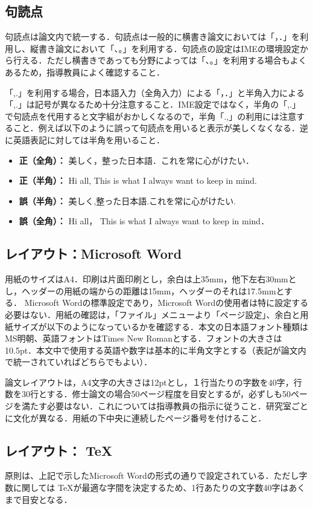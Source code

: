 \documentclass[uplatex,dvipdfmx,a4paper]{jsarticle}
\begin{document}
\subsection{句読点}
句読点は論文内で統一する．句読点は一般的に横書き論文においては「，．」を利用し、縦書き論文において「、。」を利用する．句読点の設定はIMEの環境設定から行える．ただし横書きであっても分野によっては「、。」を利用する場合もよくあるため，指導教員によく確認すること．

「,.」を利用する場合，日本語入力（全角入力）による「，．」と半角入力による「,.」は記号が異なるため十分注意すること．IME設定ではなく，半角の「,.」で句読点を代用すると文字組がおかしくなるので，半角「.,」の利用には注意すること．例えば以下のように誤って句読点を用いると表示が美しくなくなる．逆に英語表記に対しては半角を用いること．
\begin{itemize}
    \item \textbf{正（全角）：} 美しく，整った日本語．これを常に心がけたい．
    \item \textbf{正（半角）：} Hi all, This is what I always want to keep in mind.
    \item \textbf{誤（半角）：} 美しく,整った日本語.これを常に心がけたい.
    \item \textbf{誤（全角）：} Hi all， This is what I always want to keep in mind．
\end{itemize}

\subsection{レイアウト：Microsoft Word}
用紙のサイズはA4．印刷は片面印刷とし，余白は上35mm，他下左右30mmとし，ヘッダーの用紙の端からの距離は15mm，ヘッダーのそれは17.5mmとする．
Microsoft Wordの標準設定であり，Microsoft Wordの使用者は特に設定する必要はない．用紙の確認は，「ファイル」メニューより「ページ設定」、余白と用紙サイズが以下のようになっているかを確認する．本文の日本語フォント種類はMS明朝、英語フォントはTimes New Romanとする．フォントの大きさは10.5pt．本文中で使用する英語や数字は基本的に半角文字とする（表記が論文内で統一されていればどちらでもよい）．

論文レイアウトは，A4文字の大きさは12ptとし，１行当たりの字数を40字，行数を30行とする．修士論文の場合50ページ程度を目安とするが，必ずしも50ページを満たす必要はない．これについては指導教員の指示に従うこと．研究室ごとに文化が異なる．用紙の下中央に連続したページ番号を付けること．

\subsection{レイアウト： \TeX}
原則は、上記で示したMicrosoft Wordの形式の通りで設定されている．ただし字数に関しては \TeX が最適な字間を決定するため、1行あたりの文字数40字はあくまで目安となる．
\end{document}
